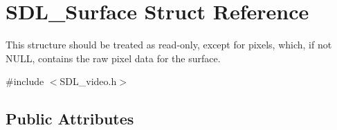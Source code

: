 \section{S\+D\+L\+\_\+\+Surface Struct Reference}
\label{struct_s_d_l___surface}


This structure should be treated as read-\/only, except for \textquotesingle{}pixels\textquotesingle{}, which, if not N\+U\+L\+L, contains the raw pixel data for the surface.  




{\ttfamily \#include $<$S\+D\+L\+\_\+video.\+h$>$}

\subsection*{Public Attributes}
